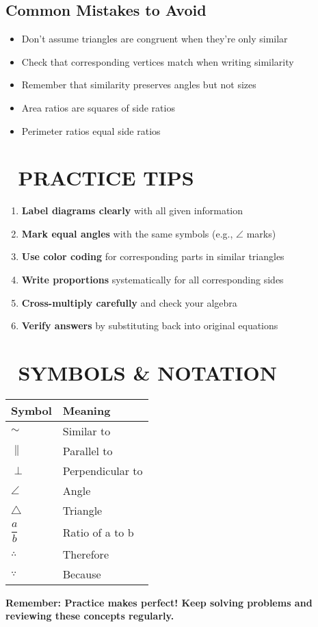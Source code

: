 \documentclass{article}
\begin{document}
\subsection*{Common Mistakes to Avoid}
\begin{itemize}
\item Don't assume triangles are congruent when they're only similar
\item Check that corresponding vertices match when writing similarity
\item Remember that similarity preserves angles but not sizes
\item Area ratios are squares of side ratios
\item Perimeter ratios equal side ratios
\end{itemize}

\section*{🎯 PRACTICE TIPS}

\begin{enumerate}
\item \textbf{Label diagrams clearly} with all given information
\item \textbf{Mark equal angles} with the same symbols (e.g., $\angle$ marks)
\item \textbf{Use color coding} for corresponding parts in similar triangles
\item \textbf{Write proportions} systematically for all corresponding sides
\item \textbf{Cross-multiply carefully} and check your algebra
\item \textbf{Verify answers} by substituting back into original equations
\end{enumerate}

\section*{📝 SYMBOLS \& NOTATION}

\begin{tabular}{|l|l|}
\hline
\textbf{Symbol} & \textbf{Meaning} \\
\hline
$\sim$ & Similar to \\
\hline
$\parallel$ & Parallel to \\
\hline
$\perp$ & Perpendicular to \\
\hline
$\angle$ & Angle \\
\hline
$\triangle$ & Triangle \\
\hline
$\dfrac{a}{b}$ & Ratio of a to b \\
\hline
$\therefore$ & Therefore \\
\hline
$\because$ & Because \\
\hline
\end{tabular}

\begin{center}
\textbf{Remember: Practice makes perfect! Keep solving problems and reviewing these concepts regularly.}
\end{center}
\end{document}
